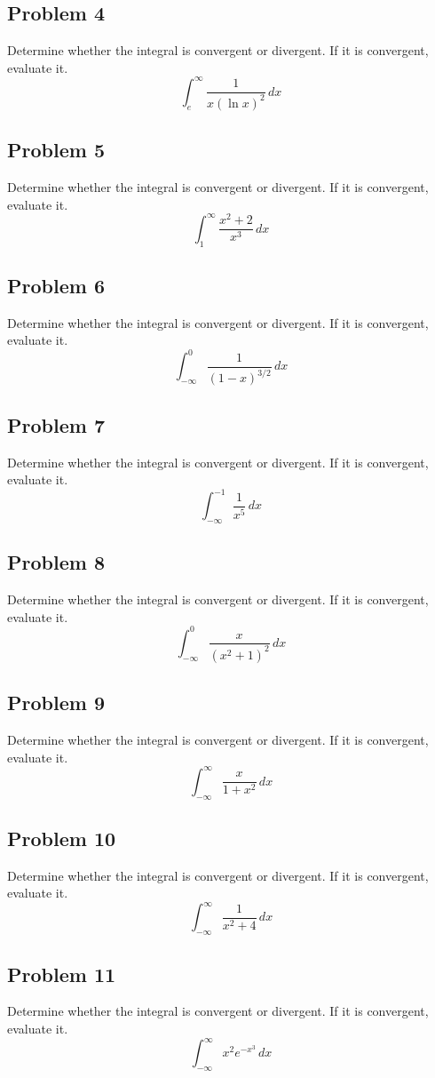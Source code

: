 \documentclass{article}
\begin{document}
\subsection*{Problem 4}
Determine whether the integral is convergent or divergent. If it is convergent, evaluate it.
\[ \int_{e}^{\infty} \frac{1}{x (\ln x)^2} \,dx \]

\subsection*{Problem 5}
Determine whether the integral is convergent or divergent. If it is convergent, evaluate it.
\[ \int_{1}^{\infty} \frac{x^2 + 2}{x^3} \,dx \]

\subsection*{Problem 6}
Determine whether the integral is convergent or divergent. If it is convergent, evaluate it.
\[ \int_{-\infty}^{0} \frac{1}{(1-x)^{3/2}} \,dx \]

\subsection*{Problem 7}
Determine whether the integral is convergent or divergent. If it is convergent, evaluate it.
\[ \int_{-\infty}^{-1} \frac{1}{x^5} \,dx \]

\subsection*{Problem 8}
Determine whether the integral is convergent or divergent. If it is convergent, evaluate it.
\[ \int_{-\infty}^{0} \frac{x}{(x^2+1)^2} \,dx \]

\subsection*{Problem 9}
Determine whether the integral is convergent or divergent. If it is convergent, evaluate it.
\[ \int_{-\infty}^{\infty} \frac{x}{1+x^2} \,dx \]

\subsection*{Problem 10}
Determine whether the integral is convergent or divergent. If it is convergent, evaluate it.
\[ \int_{-\infty}^{\infty} \frac{1}{x^2+4} \,dx \]

\subsection*{Problem 11}
Determine whether the integral is convergent or divergent. If it is convergent, evaluate it.
\[ \int_{-\infty}^{\infty} x^2 e^{-x^3} \,dx \]
\end{document}
